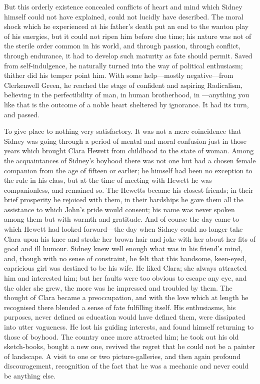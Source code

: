 But this orderly existence concealed conflicts of heart and mind which
Sidney himself could not have explained, could not lucidly have
described. The moral shock which he experienced at his father's death
put an end to the wanton play of his energies, but it could not ripen
him before due time; his nature was not of the sterile order common in
his world, and through passion, through conflict, through endurance, it
had to develop such maturity as fate should permit. Saved from
self-indulgence, he naturally turned into the way of political
enthusiasm; thither did his temper point him. With some help---mostly
negative---from Clerkenwell Green, he reached the stage of confident and
aspiring Radicalism, believing in the perfectibility of man, in human
brotherhood, in {\protect\hypertarget{138}{}{}}---anything you like that
is the outcome of a noble heart sheltered by ignorance. It had its turn,
and passed.

To give place to nothing very satisfactory. It was not a mere
coincidence that Sidney was going through a period of mental and moral
confusion just in those years which brought Clara Hewett from childhood
to the state of woman. Among the acquaintances of Sidney's boyhood there
was not one but had a chosen female companion from the age of fifteen or
earlier; he himself had been no exception to the rule in his class, but
at the time of meeting with Hewett he was companionless, and remained
so. The Hewetts became his closest friends; in their brief prosperity he
rejoiced with them, in their hardships he gave them all the assistance
to which John's pride would consent; his name was never spoken among
them but with warmth and gratitude. And of course the day came to which
Hewett had looked forward---the day when Sidney could no longer take
Clara upon his knee and stroke her {\protect\hypertarget{139}{}{}}brown
hair and joke with her about her fits of good and ill humour. Sidney
knew well enough what was in his friend's mind, and, though with no
sense of constraint, he felt that this handsome, keen-eyed, capricious
girl was destined to be his wife. He liked Clara; she always attracted
him and interested him; but her faults were too obvious to escape any
eye, and the older she grew, the more was he impressed and troubled by
them. The thought of Clara became a preoccupation, and with the love
which at length he recognised there blended a sense of fate fulfilling
itself. His enthusiasms, his purposes, never defined as education would
have defined them, were dissipated into utter vagueness. He lost his
guiding interests, and found himself returning to those of boyhood. The
country once more attracted him; he took out his old sketch-books,
bought a new one, revived the regret that he could not be a painter of
landscape. A visit to one or two picture-galleries, and then again
profound discouragement, recognition of the fact that
{\protect\hypertarget{140}{}{}}he was a mechanic and never could be
anything else.

